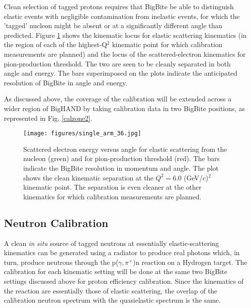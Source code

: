 \documentclass[12pt,letterpaper,oneside]{article}
\begin{document}
Clean selection of tagged protons requires that BigBite
be able to distinguish elastic events with negligible
contamination from inelastic events, for which the 'tagged' nucleon
might be absent or at a significantly different angle than
predicted.  Figure \ref{fig-elastic-inelastic-kin} shows the
kinematic locus for elastic scattering kinematics (in the region of each of the
highest-Q$^2$ kinematic point for which calibration measurements are
planned) and the locus of the scattered-electron
kinematics for pion-production threshold.  The two are seen to be
cleanly separated in both angle and energy.  The bars superimposed on
the plots indicate the anticipated resolution of BigBite in angle and energy.

As discussed above, the coverage of the calibration will be
extended across a wider region of BigHAND by taking calibration data
in two BigBite positions, as represented in Fig. \ref{calzone2}.


\begin{figure}
\begin{center}
\texttt{[image: figures/single\_arm\_36.jpg]}\\
\end{center}
\caption{\label{fig-elastic-inelastic-kin}
Scattered electron energy versus angle for elastic scattering from the
nucleon (green) and for pion-production threshold (red).  The bars
indicate the BigBite resolution in momentum and angle.  
The plot shows the clean kinematic separation at the $Q^2=6.0$
(GeV/c)$^2$ kinematic point.  The separation is even cleaner at the other
kinematics for which calibration measurements are planned.}
\end{figure}



\subsection{Neutron Calibration}

\label{n-cal}
A clean {\it in situ} source of tagged neutrons at essentially 
elastic-scattering kinematics 
 can be generated using a radiator to produce real photons
which, in turn,  produce neutrons through the p($\gamma,\pi^+$)n reaction on a
Hydrogen target.  The calibration for each kinematic setting 
will be done at the same two BigBite
settings discussed above for proton efficiency calibration.
Since the kinematics of the reaction are essentially those of elastic
scattering, the overlap of the calibration neutron spectrum with the
quasielastic spectrum is the same.
  
\end{document}
